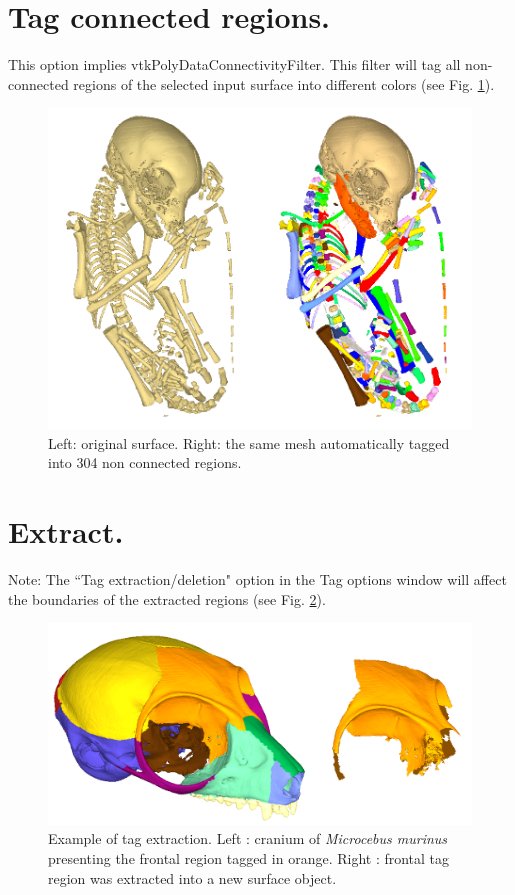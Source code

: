 \section{Tag connected regions.}
This option implies vtkPolyDataConnectivityFilter. This filter will tag all non-connected regions of the
selected input surface into different colors (see Fig. \ref{tag_connected}).
\begin{figure}
  \centering
  \includegraphics[scale=0.45]{images/Tags/Lemur_tag_input_output.png} 
	\caption{Left: original surface. Right: the same mesh automatically tagged into 304 non connected regions.}
\label{tag_connected}
 
\end{figure}



\section{Extract.}


Note: The ``Tag extraction/deletion" option in the Tag options window will affect the boundaries of
the extracted regions (see Fig. \ref{tag_extraction}).

\begin{figure}
  \centering
  \includegraphics[scale=0.35]{images/Tags/Extract_tag.png} 
	\caption{Example of tag extraction. Left : cranium of \textit{Microcebus murinus} presenting the frontal region
tagged in orange. Right : frontal tag region was extracted into a new surface object.}
\label{tag_extraction}
 
\end{figure}



